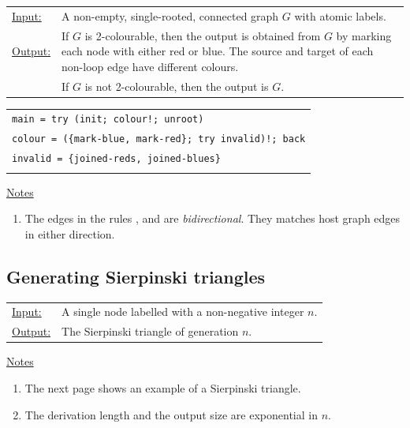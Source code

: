 \begin{tabular}{lp{10.5cm}}
\ul{Input:} & A non-empty, single-rooted, connected graph $G$ with atomic labels. \\
\ul{Output:} & If $G$\/ is 2-colourable, then the output is obtained from $G$\/ by marking each node with either red or blue. The source and target of each non-loop edge have different colours.\\
& If $G$\/ is not 2-colourable, then the output is $G$.
\end{tabular}

\vspace{10pt}
\begin{tabular}{|l|}
\hline 
\rule{0pt}{3ex} \hspace{0pt} \texttt{main = try (init; colour!; unroot)} \\
\hspace{2pt} \texttt{colour = (\{mark-blue, mark-red\}; try invalid)!; back} \\
\hspace{2pt} \texttt{invalid = \{joined-reds, joined-blues\}} \\
 \\
\hline
\end{tabular}
\vspace{10pt}

\ul{Notes}
\begin{enumerate}
\setlength{\itemsep}{-.5ex}
\item The edges in the rules ,  and  are \emph{bidirectional}. They matches host graph edges in either direction.
\end{enumerate}


\subsection{Generating Sierpinski triangles}

\begin{tabular}{lp{10.5cm}}
\ul{Input:} & A single node labelled with a non-negative integer $n$. \\
\ul{Output:} & The Sierpinski triangle of generation $n$.
\end{tabular}
  
\begin{center}

\end{center}

\ul{Notes}
\begin{enumerate}
\setlength{\itemsep}{-.5ex}
\item The next page shows an example of a Sierpinski triangle.
\item The derivation length and the output size are exponential in $n$.
\end{enumerate}

